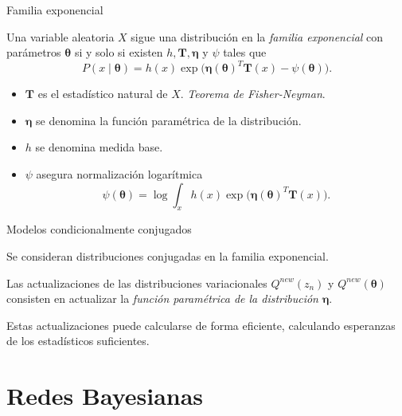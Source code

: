 \documentclass[aspectratio=169]{beamer}
\newcommand{\btheta}{\bm{\theta}}
\begin{document}
  \begin{frame}{Familia exponencial}
    \begin{shaded}
      Una variable aleatoria \(X\) sigue una distribución en la \emph{familia exponencial} con parámetros \(\btheta\) si y solo si existen \(h, \bm{T}, \bm{\eta}\) y \(\psi\) tales que
      \[
        P(x \mid \btheta) = h(x) \exp \Big( \bm{\eta}(\btheta)^{T}\bm{T}(x) - \psi(\btheta)\Big).
      \]
    \end{shaded}
    \begin{itemize}
      \item \(\bm{T}\) es el estadístico natural de \(X\). \emph{Teorema de Fisher-Neyman}.
      \item \(\bm{\eta}\) se denomina la función paramétrica de la distribución.
      \item \(h\) se denomina medida base.
      \item \(\psi\) asegura normalización logarítmica
        \[
        \psi(\btheta) = \log \int_{x} h(x)\exp \Big( \bm{\eta}(\btheta)^{T}\bm{T}(x) \Big).
        \]
    \end{itemize}
  \end{frame}

  \begin{frame}{Modelos condicionalmente conjugados}

    Se consideran distribuciones conjugadas en la familia exponencial.

    Las actualizaciones de las distribuciones variacionales \(Q^{new}(z_{n})\) y \(Q^{new}(\btheta)\) consisten en actualizar la \emph{función paramétrica de la distribución} \(\bm{\eta}\).

    Estas actualizaciones puede calcularse de forma eficiente, calculando esperanzas de los estadísticos suficientes.

  \end{frame}

  \section{Redes Bayesianas}
\end{document}
